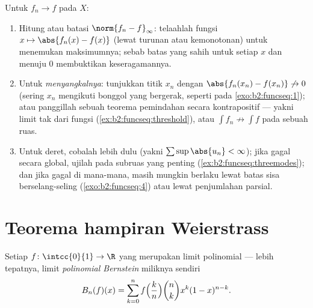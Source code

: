 \begin{method}\label{met:b2:funcseq:uniform}
Untuk $f_n \to f$  pada $X$:
\begin{enumerate}
  \item Hitung atau batasi $\norm{f_n - f}_\infty$: telaahlah
        fungsi $x \mapsto \abs{f_n(x) - f(x)}$ (lewat turunan atau
        kemonotonan) untuk menemukan maksimumnya; sebab batas yang
        sahih untuk setiap $x$ dan menuju $0$ membuktikan keseragamannya.
  \item Untuk \emph{menyangkalnya}: tunjukkan titik $x_n$ dengan
        $\abs{f_n(x_n) - f(x_n)} \not\to 0$ (sering $x_n$ mengikuti
        bonggol yang bergerak, seperti pada \cref{exo:b2:funcseq:1});
        atau panggillah sebuah teorema pemindahan secara kontrapositif
        --- yakni limit tak  dari fungsi 
        (\cref{ex:b2:funcseq:threshold}), atau $\int f_n
        \not\to \int f$ pada sebuah ruas.
  \item Untuk deret, cobalah  lebih dulu
        (yakni $\sum\sup\abs{u_n} < \infty$); jika gagal secara global,
        ujilah pada subruas yang penting
        (\cref{ex:b2:funcseq:threemodes}); dan jika gagal
        di mana-mana,  masih mungkin berlaku
        lewat batas sisa berselang-seling
        (\cref{exo:b2:funcseq:4}) atau lewat penjumlahan parsial.
\end{enumerate}
\end{method}

\section{Teorema hampiran Weierstrass}

\begin{theorem}\label{thm:b2:funcseq:weierstrass}
Setiap $f \colon \intcc{0}{1} \to \R$ yang  merupakan limit
 polinomial --- lebih tepatnya, limit \emph{polinomial
Bernstein} miliknya sendiri
\[
B_n(f)(x) = \sum_{k=0}^{n} f\Bigl(\frac kn\Bigr)\binom nk x^k
(1-x)^{n-k} .
\]
\end{theorem}

